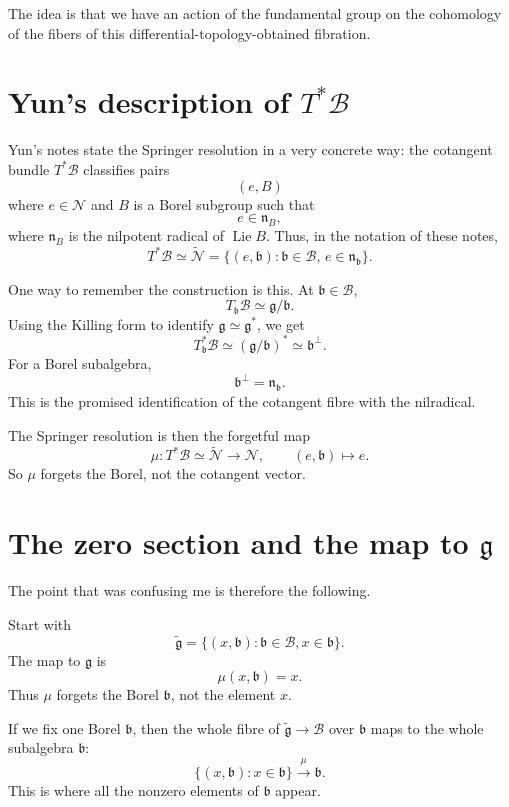 The idea is that we have
an action of the fundamental
group on the cohomology of the fibers
of this differential-topology-obtained
fibration.

\section{Yun's description of
$T^*\mathcal B$}
\label{section-yuns-description}

Yun's notes \cite[\S 1.2.1]{YunSpringer}
state the Springer resolution in a very
concrete way:
the cotangent bundle $T^*\mathcal B$
classifies pairs
$$
(e,B)
$$
where $e \in \mathcal N$ and $B$ is a Borel
subgroup such that
$$
e \in \mathfrak n_B,
$$
where $\mathfrak n_B$ is the nilpotent
radical of $\operatorname{Lie}B$.
Thus, in the notation of these notes,
$$
T^*\mathcal B
\simeq
\widetilde{\mathcal N}
=
\{(e,\mathfrak b):
\mathfrak b\in\mathcal B,\,
e\in\mathfrak n_{\mathfrak b}\}.
$$

One way to remember the construction is this.
At $\mathfrak b\in\mathcal B$,
$$
T_{\mathfrak b}\mathcal B
\simeq
\mathfrak g/\mathfrak b.
$$
Using the Killing form to identify
$\mathfrak g\simeq\mathfrak g^*$, we get
$$
T^*_{\mathfrak b}\mathcal B
\simeq
(\mathfrak g/\mathfrak b)^*
\simeq
\mathfrak b^\perp.
$$
For a Borel subalgebra,
$$
\mathfrak b^\perp=\mathfrak n_{\mathfrak b}.
$$
This is the promised identification of the
cotangent fibre with the nilradical.

The Springer resolution is then the forgetful
map
$$
\mu:T^*\mathcal B\simeq\widetilde{\mathcal N}
\longrightarrow \mathcal N,
\qquad
(e,\mathfrak b)\longmapsto e.
$$
So $\mu$ forgets the Borel, not the cotangent
vector.

\section{The zero section and the map to
$\mathfrak{g}$}
\label{section-zero-section-map-to-g}

The point that was confusing me is therefore
the following.

Start with
$$
\widetilde{\mathfrak{g}}
=
\{(x,\mathfrak{b}):
\mathfrak{b}\in \mathcal{B},
x\in\mathfrak{b}\}.
$$
The map to $\mathfrak{g}$ is
$$
\mu(x,\mathfrak{b})=x.
$$
Thus $\mu$ forgets the Borel
$\mathfrak{b}$, not the element $x$.

If we fix one Borel $\mathfrak{b}$,
then the whole fibre of
$\widetilde{\mathfrak{g}}\to\mathcal{B}$
over $\mathfrak{b}$ maps to the whole
subalgebra $\mathfrak{b}$:
$$
\{(x,\mathfrak{b}):x\in\mathfrak{b}\}
\xrightarrow{\mu}
\mathfrak{b}.
$$
This is where all the nonzero elements
of $\mathfrak{b}$ appear.

